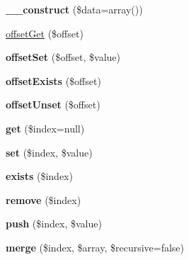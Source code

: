 \begin{DoxyCompactItemize}
\item 
\hypertarget{classMatrix_a637568c15f5a0bc394e1455ffd25e890}{
{\bfseries \_\-\_\-construct} (\$data=array())}
\label{classMatrix_a637568c15f5a0bc394e1455ffd25e890}

\item 
\hyperlink{classMatrix_a7d0cdba14c85aa64f8e58c7b355b471f}{offsetGet} (\$offset)
\item 
\hypertarget{classMatrix_ae93338a5117b65f2c061ea077319288c}{
{\bfseries offsetSet} (\$offset, \$value)}
\label{classMatrix_ae93338a5117b65f2c061ea077319288c}

\item 
\hypertarget{classMatrix_ae202c265c3a009502e5a4bdcec57770e}{
{\bfseries offsetExists} (\$offset)}
\label{classMatrix_ae202c265c3a009502e5a4bdcec57770e}

\item 
\hypertarget{classMatrix_a26657ae4c8383f450b526f4130f4c7fd}{
{\bfseries offsetUnset} (\$offset)}
\label{classMatrix_a26657ae4c8383f450b526f4130f4c7fd}

\item 
\hypertarget{classMatrix_aa089db69c0551ab73632aeebd21fdd6c}{
{\bfseries get} (\$index=null)}
\label{classMatrix_aa089db69c0551ab73632aeebd21fdd6c}

\item 
\hypertarget{classMatrix_ab455113ea3edb53f69640adc25f56339}{
{\bfseries set} (\$index, \$value)}
\label{classMatrix_ab455113ea3edb53f69640adc25f56339}

\item 
\hypertarget{classMatrix_af536864d271ee38364bc21f823ef47cf}{
{\bfseries exists} (\$index)}
\label{classMatrix_af536864d271ee38364bc21f823ef47cf}

\item 
\hypertarget{classMatrix_aa222cc0275be3792a02411ed914e71a9}{
{\bfseries remove} (\$index)}
\label{classMatrix_aa222cc0275be3792a02411ed914e71a9}

\item 
\hypertarget{classMatrix_a97ff70dca372b9477030830150bafb74}{
{\bfseries push} (\$index, \$value)}
\label{classMatrix_a97ff70dca372b9477030830150bafb74}

\item 
\hypertarget{classMatrix_a5dbb608acffa263203b35cf5c48af596}{
{\bfseries merge} (\$index, \$array, \$recursive=false)}
\label{classMatrix_a5dbb608acffa263203b35cf5c48af596}

\end{DoxyCompactItemize}
